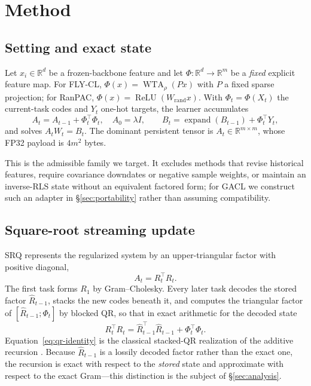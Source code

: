 \documentclass{article}
\begin{document}
\section{Method}
\label{sec:method}

\subsection{Setting and exact state}

Let $x_i\in\mathbb{R}^{d}$ be a frozen-backbone feature and let
$\Phi:\mathbb{R}^{d}\to\mathbb{R}^{m}$ be a \emph{fixed} explicit feature map.
For FLY-CL, $\Phi(x)=\operatorname{WTA}_{\rho}(Px)$ with $P$ a fixed sparse
projection; for RanPAC, $\Phi(x)=\operatorname{ReLU}(W_{\mathrm{rand}}x)$. With
$\Phi_t=\Phi(X_t)$ the current-task codes and $Y_t$ one-hot targets, the
learner accumulates
\begin{equation}
A_t=A_{t-1}+\Phi_t^{\top}\Phi_t,\quad A_0=\lambda I,
\qquad
B_t=\operatorname{expand}(B_{t-1})+\Phi_t^{\top}Y_t,
\label{eq:exact-update}
\end{equation}
and solves $A_tW_t=B_t$. The dominant persistent tensor is
$A_t\in\mathbb{R}^{m\times m}$, whose FP32 payload is $4m^2$ bytes.

This is the admissible family we target. It excludes methods that revise
historical features, require covariance downdates or negative sample weights,
or maintain an inverse-RLS state without an equivalent factored form; for GACL
we construct such an adapter in \S\ref{sec:portability} rather than assuming
compatibility.

\subsection{Square-root streaming update}

SRQ represents the regularized system by an upper-triangular factor with
positive diagonal,
\begin{equation}
A_t=R_t^{\top}R_t .
\label{eq:square-root}
\end{equation}
The first task forms $R_1$ by Gram--Cholesky. Every later task decodes the
stored factor $\widehat R_{t-1}$, stacks the new codes beneath it, and computes
the triangular factor of $[\widehat R_{t-1};\Phi_t]$ by blocked QR, so that in
exact arithmetic for the decoded state
\begin{equation}
R_t^{\top}R_t=\widehat R_{t-1}^{\top}\widehat R_{t-1}+\Phi_t^{\top}\Phi_t .
\label{eq:qr-identity}
\end{equation}
Equation~\ref{eq:qr-identity} is the classical stacked-QR realization of the
additive recursion \citep{gill1974,golub2013}. Because $\widehat R_{t-1}$ is a
lossily decoded factor rather than the exact one, the recursion is exact with
respect to the \emph{stored} state and approximate with respect to the exact
Gram---this distinction is the subject of \S\ref{sec:analysis}.
\end{document}
